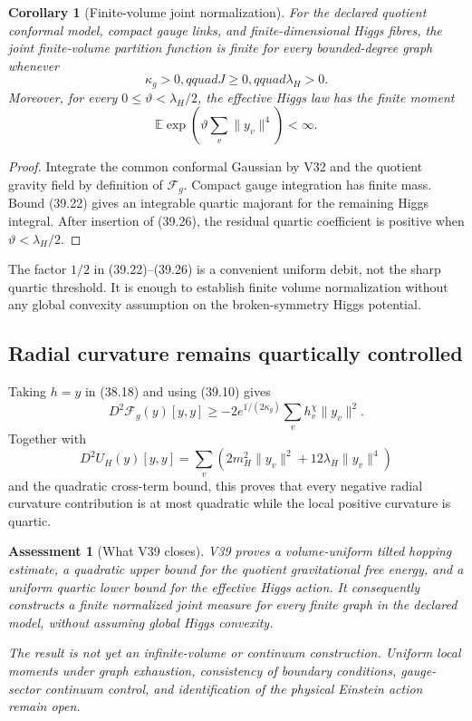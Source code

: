 \documentclass[11pt]{article}
\newtheorem{corollary}[theorem]{Corollary}
\newtheorem{assessment}[theorem]{Assessment}
\theoremstyle{remark}
\begin{document}
\begin{corollary}[Finite-volume joint normalization]
\label{cor:v17v39-normalization}
For the declared quotient conformal model, compact gauge links, and
finite-dimensional Higgs fibres, the joint finite-volume partition
function is finite for every bounded-degree graph whenever
\[
 \kappa_g>0,qquad J\geq0,qquad\lambda_H>0.        \tag{39.25}
\]
Moreover, for every \(0\leq\vartheta<\lambda_H/2\), the effective Higgs
law has the finite moment
\[
 \mathbb E\exp\left(
 \vartheta\sum_v\|y_v\|^4\right)<\infty.          \tag{39.26}
\]
\end{corollary}

\begin{proof}
Integrate the common conformal Gaussian by V32 and the quotient gravity
field by definition of \(\mathcal F_g\).  Compact gauge integration has
finite mass.  Bound (39.22) gives an integrable quartic majorant for the
remaining Higgs integral.  After insertion of (39.26), the residual
quartic coefficient is positive when
\(\vartheta<\lambda_H/2\).
\end{proof}

The factor \(1/2\) in (39.22)--(39.26) is a convenient uniform debit,
not the sharp quartic threshold.  It is enough to establish finite
volume normalization without any global convexity assumption on the
broken-symmetry Higgs potential.

\subsection{Radial curvature remains quartically controlled}

Taking \(h=y\) in (38.18) and using (39.10) gives
\[
 D^2\mathcal F_g(y)[y,y]
 \geq-2e^{1/(2\kappa_g)}
 \sum_vh_v^\chi\|y_v\|^2.                         \tag{39.27}
\]
Together with
\[
 D^2U_H(y)[y,y]
 =\sum_v\left(2m_H^2\|y_v\|^2
 +12\lambda_H\|y_v\|^4\right)                   \tag{39.28}
\]
and the quadratic cross-term bound, this proves that every negative
radial curvature contribution is at most quadratic while the local
positive curvature is quartic.

\begin{assessment}[What V39 closes]
\label{ass:v17v39-status}
V39 proves a volume-uniform tilted hopping estimate, a quadratic upper
bound for the quotient gravitational free energy, and a uniform
quartic lower bound for the effective Higgs action.  It consequently
constructs a finite normalized joint measure for every finite graph in
the declared model, without assuming global Higgs convexity.

The result is not yet an infinite-volume or continuum construction.
Uniform local moments under graph exhaustion, consistency of boundary
conditions, gauge-sector continuum control, and identification of the
physical Einstein action remain open.
\end{assessment}
\end{document}
